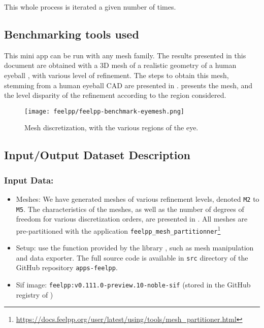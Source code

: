 This whole process is iterated a given number of times.



\subsection{Benchmarking tools used}

This mini app can be run with any mesh family.
The results presented in this document are obtained with a 3D mesh of a realistic geometry of a human eyeball \cite{saigre_model_2024}, with various level of refinement.
The steps to obtain this mesh, stemming from a human eyeball CAD are presented in \cite{chabannes_3d_2024}.
 presents the mesh, and the level disparity of the refinement according to the region considered.

\begin{figure}
  \centering
  \texttt{[image: feelpp/feelpp-benchmark-eyemesh.png]}
  \caption{Mesh discretization, with the various regions of the eye.}
  \label{fig:spec:app-feelpp:eye2brain:mesh}
\end{figure}




\subsection{Input/Output Dataset Description}


\subsubsection{Input Data:}
  \begin{itemize}
    \item Meshes: We have generated meshes of various refinement levels, denoted \texttt{M2} to \texttt{M5}.
      The characteristics of the meshes, as well as the number of degrees of freedom for various discretization orders, are presented in .
      All meshes are pre-partitioned with the application \texttt{feelpp\_mesh\_partitionner}\footnote{\url{https://docs.feelpp.org/user/latest/using/tools/mesh_partitioner.html}}
    \item Setup: use the function provided by the library \Feelpp, such as mesh manipulation and data exporter.
      The full source code is available in \texttt{src} directory of the GitHub repository \texttt{apps-feelpp}.
    \item Sif image: \texttt{feelpp:v0.111.0-preview.10-noble-sif}  (stored in the GitHub registry of \Feelpp)
  \end{itemize}


